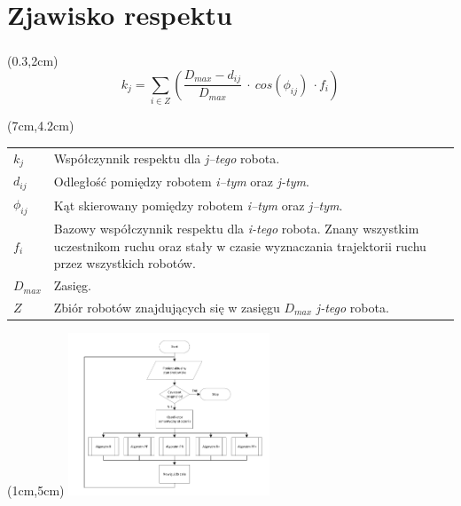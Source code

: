 \documentclass{beamer}
\begin{document}
\section{Zjawisko respektu}
\begin{frame}
\frametitle{\secname}

\begin{textblock*}{5cm}(0.3\linewidth,2cm) %
	\begin{equation*}
	k_j = \sum_{i \in Z}  \left(   \frac{D_{max} - d_{ij}}{D_{max}} ~ \cdot ~ cos(\phi_{ij}) ~ \cdot f_i \right)
	\end{equation*}
\end{textblock*}

\begin{textblock*}{5cm}(7cm,4.2cm) %
	\scriptsize{
		\begin{tabular}{lp{}}
			$ k_j $       	& Współczynnik respektu dla \textit{j--tego} robota. \\
			$ d_{ij} $    	& Odległość pomiędzy robotem \textit{i--tym} oraz \textit{j-tym}. \\
			$ \phi_{ij} $ 	& Kąt skierowany pomiędzy robotem \textit{i--tym} oraz \textit{j--tym}. \\
			$ f_i $ 		& Bazowy współczynnik respektu dla \textit{i-tego} robota. Znany wszystkim uczestnikom ruchu oraz stały w czasie wyznaczania trajektorii ruchu przez wszystkich robotów. \\
			$ D_{max} $ 	& Zasięg.  \\
			$ Z $ 			& Zbiór robotów znajdujących się w zasięgu $ D_{max} $ \textit{j-tego} robota.	
	\end{tabular}}
\end{textblock*}

\begin{textblock*}{6cm}(1cm,5cm) %
	\includegraphics[page=5,width=6cm]{img/hybrid_algorithm.pdf}
\end{textblock*}



\end{frame}
\end{document}
